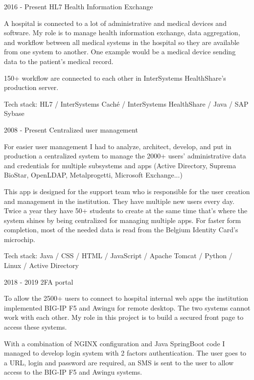 \begin{cventries}
{    }
    
  \cventry
    {2016 - Present} %
    {HL7 Health Information Exchange} %
    {} %
    {} %
    {
A hospital is connected to a lot of administrative and medical devices and software. 
My role is to manage health information exchange, data aggregation, and workflow between all medical systems in the hospital so they are available from one system to another. One example would be a medical device sending data to the patient's medical record. 

150+ workflow are connected to each other in InterSystems HealthShare's production server.

Tech stack: HL7 / InterSystems Caché / InterSystems HealthShare / Java / SAP Sybase

    }
    
  \cventry
    {2008 - Present} %
    {Centralized user management} %
    {} %
    {} %
    {
For easier user management I had to analyze, architect, develop, and put in production a centralized system to manage the 2000+ users' administrative data and credentials for multiple subsystems and apps (Active Directory, Suprema BioStar, OpenLDAP, Metalprogetti, Microsoft Exchange...)

This app is designed for the support team who is responsible for the user creation and management in the institution. They have multiple new users every day. Twice a year they have 50+ students to create at the same time that's where the system shines by being centralized for managing multiple apps.
For faster form completion, most of the needed data is read from the Belgium Identity Card's microchip.

Tech stack: Java / CSS / HTML / JavaScript / Apache Tomcat / Python / Linux / Active Directory

    }
    
    
  \cventry
    {2018 - 2019} %
    {2FA portal} %
    {} %
    {} %
    {
To allow the 2500+ users to connect to hospital internal web apps the institution implemented BIG-IP F5 and Awingu for remote desktop. 
The two systems cannot work with each other.
My role in this project is to build a secured front page to access these systems.

With a combination of NGINX configuration and Java SpringBoot code I managed to develop login system with 2 factors authentication. The user goes to a URL, login and password are required, an SMS is sent to the user to allow access to the BIG-IP F5 and Awingu systems. 

}
\end{cventries}
